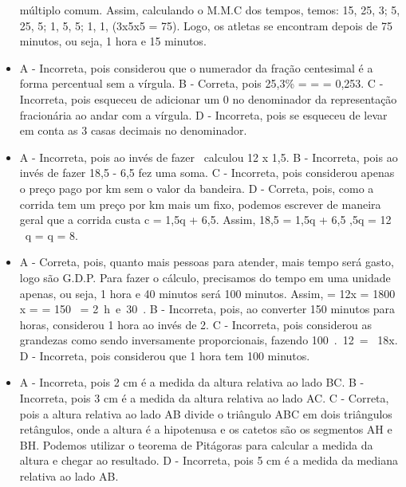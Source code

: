 \begin{itemize}
múltiplo comum. Assim, calculando o M.M.C dos tempos, temos: 15, 25, 3; 5, 25, 5; 1, 5, 5; 1, 1, (3x5x5 = 75). Logo, os atletas se encontram depois de 75 minutos, ou seja, 1 hora e 15
minutos.
\item A - Incorreta, pois considerou que o numerador da fração centesimal é a
forma percentual sem a vírgula.
B - Correta, pois
25,3\% =  =  = 0,253.
C - Incorreta, pois esqueceu de adicionar um 0 no denominador da
representação fracionária ao andar com a vírgula.
D - Incorreta, pois se esqueceu de levar em conta as 3 casas decimais no
denominador.
\item A - Incorreta, pois ao invés de fazer \ calculou 12 x
1,5. B - Incorreta, pois ao invés de fazer 18,5 - 6,5 fez uma soma. C -
Incorreta, pois considerou apenas o preço pago por km sem o valor da
bandeira. D - Correta, pois, como a corrida tem um preço por km mais um
fixo, podemos escrever de maneira geral que a corrida custa
c = 1,5q + 6,5. Assim, 18,5 = 1,5q + 6,5 ,5q = 12 \rightarrow \ q =  \rightarrow q = 8.
\item A - Correta, pois, quanto mais pessoas para atender, mais tempo será
gasto, logo são G.D.P. Para fazer o cálculo, precisamos do tempo em uma
unidade apenas, ou seja, 1 hora e 40 minutos será 100 minutos. Assim,  =  \rightarrow 12x = 1800 \rightarrow x =  = 150\  = 2\ h\ e\ 30\ . B - Incorreta, pois, ao converter 150 minutos para horas, considerou 1
hora ao invés de 2. C - Incorreta, pois considerou as grandezas como sendo inversamente
proporcionais, fazendo 100\ .\ 12\  = \ 18x. D - Incorreta, pois considerou que 1 hora tem 100 minutos.
\item A - Incorreta, pois 2 cm é a medida da altura relativa ao lado BC.
B - Incorreta, pois 3 cm é a medida da altura relativa ao lado AC.
C - Correta, pois a altura relativa ao lado AB divide o triângulo ABC em
dois triângulos retângulos, onde a altura é a hipotenusa e os catetos
são os segmentos AH e BH. Podemos utilizar o teorema de Pitágoras para
calcular a medida da altura e chegar ao resultado.
D - Incorreta, pois 5 cm é a medida da mediana relativa ao lado AB.
\end{itemize}


